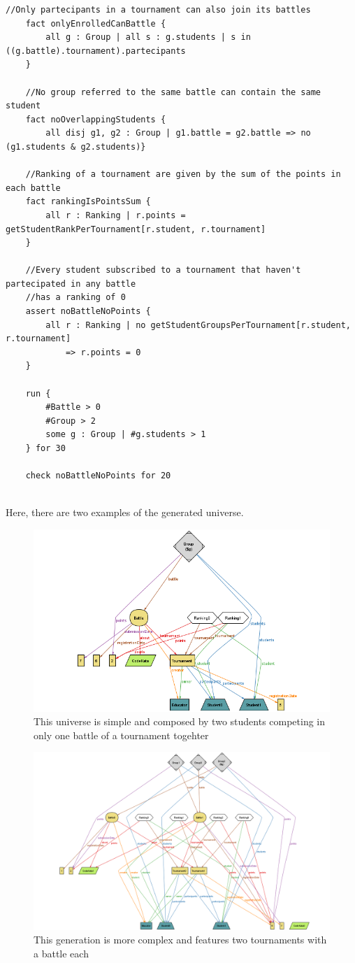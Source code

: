 \documentclass[12pt, a4paper]{report}
\begin{document}
\begin{lstlisting}[language=alloy]
    //Only partecipants in a tournament can also join its battles
    fact onlyEnrolledCanBattle {
        all g : Group | all s : g.students | s in ((g.battle).tournament).partecipants
    }
    
    //No group referred to the same battle can contain the same student
    fact noOverlappingStudents {
        all disj g1, g2 : Group | g1.battle = g2.battle => no (g1.students & g2.students)}
    
    //Ranking of a tournament are given by the sum of the points in each battle 
    fact rankingIsPointsSum {
        all r : Ranking | r.points = getStudentRankPerTournament[r.student, r.tournament]
    }
    
    //Every student subscribed to a tournament that haven't partecipated in any battle 
    //has a ranking of 0
    assert noBattleNoPoints {
        all r : Ranking | no getStudentGroupsPerTournament[r.student, r.tournament] 
            => r.points = 0
    }
    
    run {
        #Battle > 0
        #Group > 2
        some g : Group | #g.students > 1
    } for 30
    
    check noBattleNoPoints for 20
    
\end{lstlisting}
\newpage
Here, there are two examples of the generated universe.
\begin{figure}[H]
    \centering
    \includegraphics[width=0.8\linewidth]{images/AlloyGen2.png}
    \caption{This universe is simple and composed by two students competing in only one battle of a tournament togehter}
\end{figure}
\begin{figure}[H]
    \centering
    \includegraphics[width=0.8\linewidth]{images/alloyGen1.png}
    \caption{This generation is more complex and features two tournaments with a battle each}
\end{figure}
\end{document}

